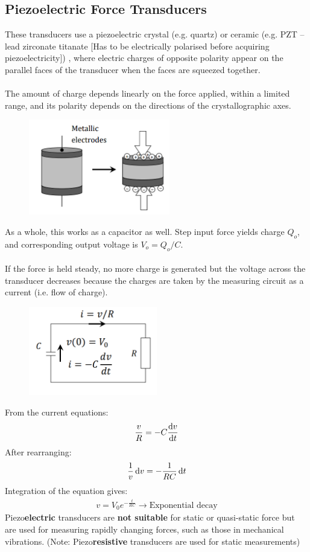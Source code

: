 \documentclass[class=report, crop=false, 12pt,a4paper]{standalone}
\begin{document}
\subsection{Piezoelectric Force Transducers}
These transducers use a piezoelectric crystal (e.g. quartz) or ceramic (e.g. PZT – lead zirconate titanate [Has to be electrically polarised before acquiring piezoelectricity]) , where electric charges of opposite polarity appear on the parallel faces of the transducer when the faces are squeezed together. \\\\
The amount of charge depends linearly on the force applied, within a limited range, and its polarity depends on the directions of the crystallographic axes.
\begin{figure}[H]
  \centering
  \includegraphics[width = 0.55\textwidth]{../img/Mdiagram27.png}
\end{figure}
As a whole, this works as a capacitor as well. Step input force yields charge $Q_o$, and corresponding output voltage is $V_o = Q_o/C$. \\\\
If the force is held steady, no more charge is generated but the voltage across the transducer decreases because the charges are taken by the measuring circuit as a current (i.e. flow of charge).
\begin{figure}[H]
  \centering
  \includegraphics[width = 0.5\textwidth]{../img/Mdiagram28.png}
\end{figure}
From the current equations:
\begin{gather}
  \frac{v}{R} = -C\frac{\dif v}{\dif t}
\end{gather}
After rearranging:
\begin{gather}
  \frac{1}{v}\dif v = -\frac{1}{RC}\dif t
\end{gather}
Integration of the equation gives: 
\begin{gather}
  v=V_0e^{-\frac{t}{RC}} \longrightarrow \text{Exponential decay}
\end{gather}
Piezo\textbf{electric} transducers are \textbf{not suitable} for static or quasi-static force but are used for measuring rapidly changing forces, such as those in mechanical vibrations. (Note: Piezo\textbf{resistive} transducers are used for static measurements)
\end{document}

